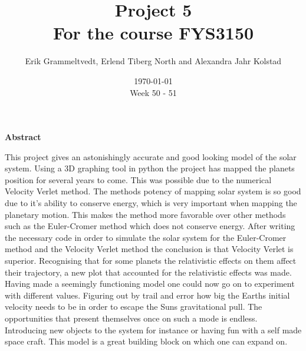 \documentclass{article}
\begin{document}
\addtocounter{page}{0}

\title{Project 5 \\
      \large For the course FYS3150}
\date{\today \\
    \vspace{1mm}
    \large Week 50 - 51}

\author{Erik Grammeltvedt, Erlend Tiberg North and Alexandra Jahr Kolstad}

\maketitle






\vspace{1cm}


\begin{center}

{\Large\textbf{Abstract}} \label{sec:Abstract}

    This project gives an astonishingly accurate and good looking model of the solar system. Using a 3D graphing tool in python the project has mapped the planets position for several years to come. This was possible due to the numerical Velocity Verlet method. The methods potency of mapping solar system is so good due to it's ability to conserve energy, which is very important when mapping the planetary motion. This makes the method more favorable over other methods such as the Euler-Cromer method which does not conserve energy. After writing the necessary code in order to simulate the solar system for the Euler-Cromer method and the Velocity Verlet method the conclusion is that Velocity Verlet is superior. Recognising that for some planets the relativistic effects on them affect their trajectory, a new plot that accounted for the relativistic effects was made. Having made a seemingly functioning model one could now go on to experiment with different values. Figuring out by trail and error how big the Earths initial velocity needs to be in order to escape the Suns gravitational pull. The opportunities that present themselves once on such a mode is endless. Introducing new objects to the system for instance or having fun with a self made space craft. This model is a great building block on which one can expand on.\\

\end{center}
\end{document}
